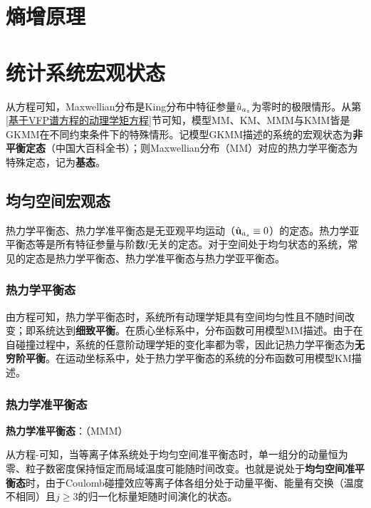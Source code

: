   \section{熵增原理}
  \label{熵增原理}

  \section{统计系统宏观状态}
  \label{统计系统宏观状态}
  
  从方程可知，Maxwellian分布是King分布中特征参量${\hat{u}}_{a_z}$为零时的极限情形。从第\ref{基于VFP谱方程的动理学矩方程}节可知，模型MM、KM、MMM与KMM皆是GKMM在不同约束条件下的特殊情形。记模型GKMM描述的系统的宏观状态为\textbf{非平衡定态}（中国大百科全书）；则Maxwellian分布（MM）对应的热力学平衡态为特殊定态，记为\textbf{基态}。
  
  \subsection{均匀空间宏观态}
  \label{均匀空间平衡态}
  
  热力学平衡态、热力学准平衡态是无亚观平均运动（$\hat{\mathbf{u}}_{a_s} \equiv 0$）的定态。热力学亚平衡态等是所有特征参量与阶数$l$无关的定态。对于空间处于均匀状态的系统，常见的定态是热力学平衡态、热力学准平衡态与热力学亚平衡态。

  \subsubsection{热力学平衡态}
  \label{热力学平衡态}
  
  由方程可知，热力学平衡态时，系统所有动理学矩具有空间均匀性且不随时间改变；即系统达到\textbf{细致平衡}。在质心坐标系中，分布函数可用模型MM描述。由于在自碰撞过程中，系统的任意阶动理学矩的变化率都为零，因此记热力学平衡态为\textbf{无穷阶平衡}。在运动坐标系中，处于热力学平衡态的系统的分布函数可用模型KM描述。
  
  \subsubsection{热力学准平衡态}
  \label{热力学准平衡态}
  \textbf{热力学准平衡态}：（MMM）
  
  从方程-可知，当等离子体系统处于均匀空间准平衡态时，单一组分的动量恒为零、粒子数密度保持恒定而局域温度可能随时间改变。也就是说处于\textbf{均匀空间准平衡态}时，由于Coulomb碰撞效应等离子体各组分处于动量平衡、能量有交换（温度不相同）且$j\ge3$的归一化标量矩随时间演化的状态。
  
